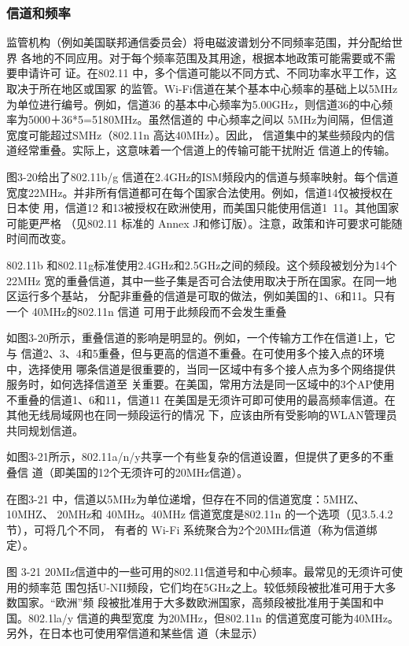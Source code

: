 \subsubsection{信道和频率}

监管机构（例如美国联邦通信委员会）将电磁波谱划分不同频率范围，并分配给世界
各地的不同应用。对于每个频率范围及其用途，根据本地政策可能需要或不需要申请许可
证。在802.11 中，多个信道可能以不同方式、不同功率水平工作，这取决于所在地区或国冢
的监管。Wi-Fi信道在某个基本中心频率的基础上以5MHz为单位进行编号。例如，信道36
的基本中心频率为5.00GHz，则信道36的中心频率为5000＋36*5=5180MHz。虽然信道的
中心频率之间以 5MHz为间隔，但信道宽度可能超过SMHz（802.11n 高达40MHz）。因此，
信道集中的某些频段内的信道经常重叠。实际上，这意味着一个信道上的传输可能干扰附近
信道上的传输。

图3-20给出了802.11b/g 信道在2.4GHz的ISM频段内的信道与频率映射。每个信道
宽度22MHz。并非所有信道都可在每个国家合法使用。例如，信道14仅被授权在日本使
用，信道12 和13被授权在欧洲使用，而美国只能使用信道1~11。其他国家可能更严格
（见802.11 标准的 Annex J和修订版）。注意，政策和许可要求可能随时间而改变。

802.11b 和802.11g标准使用2.4GHz和2.5GHz之间的频段。这个频段被划分为14个 22MHz
宽的重叠信道，其中一些子集是否可合法使用取决于所在国家。在同一地区运行多个基站，
分配非重叠的信道是可取的做法，例如美国的1、6和11。只有一个 40MHz的802.11n 信道
可用于此频段而不会发生重叠

如图3-20所示，重叠信道的影响是明显的。例如，一个传输方工作在信道1上，它与
信道2、3、4和5重叠，但与更高的信道不重叠。在可使用多个接入点的环境中，选择使用
哪条信道是很重要的，当同一区域中有多个接人点为多个网络提供服务时，如何选择信道至
关重要。在美国，常用方法是同一区域中的3个AP使用不重叠的信道1、6和11，信道11
在美国是无须许可即可使用的最高频率信道。在其他无线局域网也在同一频段运行的情况
下，应该由所有受影响的WLAN管理员共同规划信道。

如图3-21所示，802.11a/n/y共享一个有些复杂的信道设置，但提供了更多的不重叠信
道（即美国的12个无须许可的20MHz信道）。

在图3-21 中，信道以5MHz为单位递增，但存在不同的信道宽度：5MHZ、10MHZ、
20MHz和 40MHz。40MHz 信道宽度是802.11n 的一个选项（见3.5.4.2节），可将几个不同，
有者的 Wi-Fi 系统聚合为2个20MHz信道（称为信道绑定）。


图 3-21
20MIz信道中的一些可用的802.11信道号和中心频率。最常见的无须许可使用的频率范
围包括U-NII频段，它们均在5GHz之上。较低频段被批准可用于大多数国家。“欧洲”频
段被批准用于大多数欧洲国家，高频段被批准用于美国和中国。802.1la/y 信道的典型宽度
为20MHz，但802.11n 的信道宽度可能为40MHz。另外，在日本也可使用窄信道和某些信
道（未显示）

